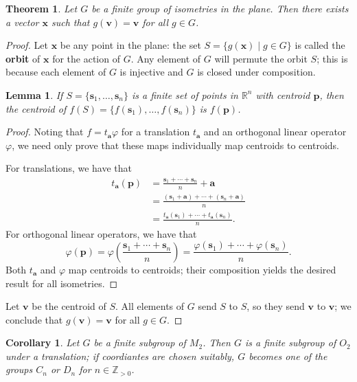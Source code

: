 \documentclass[11pt]{article}
\renewcommand{\vec}[1]{\mathbf{#1}}
\newtheorem{theorem}{Theorem}
\newtheorem{lemma}{Lemma}
\newtheorem{corollary}{Corollary}
\begin{document}
\begin{adjustwidth}{1cm}{}
	\begin{theorem}
		Let $G$ be a finite group of isometries in the plane. Then there exists a vector $\vec{x}$ such that $g(\vec{v}) = \vec{v}$ for all $g \in G$.
	\end{theorem}
	\begin{proof}
		Let $\vec{x}$ be any point in the plane: the set $S = \{ g(\vec{x}) \mid g \in G \}$ is called the \textbf{orbit} of $\vec{x}$ for the action of $G$. Any element of $G$ will permute the orbit $S$; this is because each element of $G$ is injective and $G$ is closed under composition. 
		\begin{adjustwidth}{1cm}{}
			\begin{lemma}
				If $S = \{ \vec{s}_{1}, \ldots, \vec{s}_{n} \}$ is a finite set of points in $\mathbb{R}^{n}$ with centroid $\vec{p}$, then the centroid of $f(S) = \{ f(\vec{s}_{1}), \ldots, f(\vec{s}_{n}) \}$ is $f(\vec{p})$.
			\end{lemma}
			\begin{proof}\renewcommand{\qedsymbol}{}
				Noting that $f = t_{\vec{a}} \varphi$ for a translation $t_{\vec{a}}$ and an orthogonal linear operator $\varphi$, we need only prove that these maps individually map centroids to centroids.
				
				For translations, we have that
				\begin{align*}
					t_{\vec{a}} (\vec{p}) &= \frac{\vec{s}_{1} + \cdots + \vec{s}_{n}}{n} + \vec{a} \\
					&= \frac{(\vec{s}_{1} + \vec{a}) + \cdots + (\vec{s}_{n} + \vec{a})}{n} \\
					&= \frac{t_{\vec{a}}(\vec{s}_{1}) + \cdots + t_{\vec{a}}(\vec{s}_{n})}{n}.
				\end{align*}
				For orthogonal linear operators, we have that
				\[
					\varphi(\vec{p}) = \varphi \left( \frac{\vec{s}_{1} + \cdots + \vec{s}_{n}}{n} \right) = \frac{\varphi(\vec{s}_{1}) + \cdots + \varphi(\vec{s}_{n})}{n}.
				\]
				Both $t_{\vec{a}}$ and $\varphi$ map centroids to centroids; their composition yields the desired result for all isometries.
			\end{proof}
		\end{adjustwidth}
		Let $\vec{v}$ be the centroid of $S$. All elements of $G$ send $S$ to $S$, so they send $\vec{v}$ to $\vec{v}$; we conclude that $g(\vec{v}) = \vec{v}$ for all $g \in G$.
	\end{proof}
	\begin{corollary}
		Let $G$ be a finite subgroup of $M_{2}$. Then $G$ is a finite subgroup of $O_{2}$ under a translation; if coordiantes are chosen suitably, $G$ becomes one of the groups $C_{n}$ or $D_{n}$ for $n \in \mathbb{Z}_{> 0}$.
	\end{corollary}
\end{adjustwidth}


\end{document}
